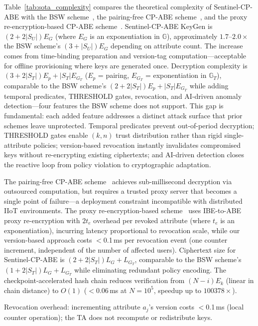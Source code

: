 \documentclass[lettersize,journal]{IEEEtran}
\begin{document}
Table~\ref{tab:sota_complexity} compares the theoretical complexity
of Sentinel-CP-ABE with the BSW scheme~\cite{Bethencourt2007},
the pairing-free CP-ABE scheme~\cite{Guo2024}, and the proxy
re-encryption-based CP-ABE scheme~\cite{Zhang2024_TDSC}.
Sentinel-CP-ABE KeyGen is $(2+2|S_U|)E_G$ (where $E_G$ is an
exponentiation in $\mathbb{G}$), approximately $1.7$--$2.0\times$ the BSW scheme's
$(3+|S_U|)E_G$ depending on attribute count. The increase comes from time-binding preparation and
version-tag computation---acceptable for offline provisioning where
keys are generated once. Decryption complexity is
$(3+2|S_T|)E_p + |S_T|E_{G_T}$ ($E_p$ = pairing, $E_{G_T}$ =
exponentiation in $\mathbb{G}_T$), comparable to the BSW scheme's
$(2+2|S_T|)E_p + |S_T|E_{G_T}$ while adding temporal predicates,
THRESHOLD gates, revocation, and AI-driven anomaly detection---four
features the BSW scheme does not support. This gap is fundamental:
each added feature addresses a distinct attack surface that prior
schemes leave unprotected. Temporal predicates prevent out-of-period
decryption; THRESHOLD gates enable $(k,n)$ trust distribution rather
than rigid single-attribute policies; version-based revocation
instantly invalidates compromised keys without re-encrypting existing
ciphertexts; and AI-driven detection closes the reactive loop from
policy violation to cryptographic adaptation.

The pairing-free CP-ABE scheme~\cite{Guo2024} achieves sub-millisecond
decryption via outsourced computation, but requires a trusted proxy
server that becomes a single point of failure---a deployment
constraint incompatible with distributed IIoT environments. The proxy
re-encryption-based scheme~\cite{Zhang2024_TDSC} uses IBE-to-ABE proxy
re-encryption with $2t_e$ overhead per revoked attribute (where $t_e$
is an exponentiation), incurring latency proportional to revocation
scale, while our version-based approach costs $<$0.1\,ms per revocation
event (one counter increment, independent of the number of affected
users). Ciphertext size for
Sentinel-CP-ABE is $(2+2|S_T|)L_G + L_{G_T}$, comparable to the BSW scheme's
$(1+2|S_T|)L_G + L_{G_T}$ while eliminating redundant policy encoding. The checkpoint-accelerated hash chain
reduces verification from $(N-i)E_k$ (linear in chain distance) to
$O(1)$ ($<0.06$\,ms at $N=10^5$, speedup up to $100378\times$).

Revocation overhead: incrementing attribute $a_j$'s version costs
$<$0.1\,ms (local counter operation); the TA does not recompute or
redistribute keys.
\end{document}
